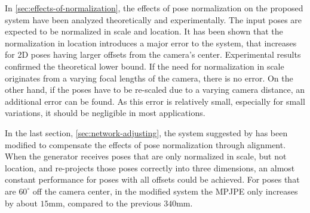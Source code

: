 In \autoref{sec:effects-of-normalization}, the effects of pose normalization on the proposed system have been analyzed theoretically and experimentally.
The input poses are expected to be normalized in scale and location.
It has been shown that the normalization in location introduces a major error to the system, that increases for 2D poses having larger offsets from the camera's center.
Experimental results confirmed the theoretical lower bound.
If the need for normalization in scale originates from a varying focal lengths of the camera, there is no error.
On the other hand, if the poses have to be re-scaled due to a varying camera distance, an additional error can be found.
As this error is relatively small, especially for small variations, it should be negligible in most applications.

In the last section, \autoref{sec:network-adjusting}, the system suggested by \citet{drover18} has been modified to compensate the effects of pose normalization through alignment.
When the generator receives poses that are only normalized in scale, but not location, and re-projects those poses correctly into three dimensions, an almost constant performance for poses with all offsets could be achieved.
For poses that are $60^{\circ}$ off the camera center, in the modified system the MPJPE only increases by about $15$mm, compared to the previous $340$mm.